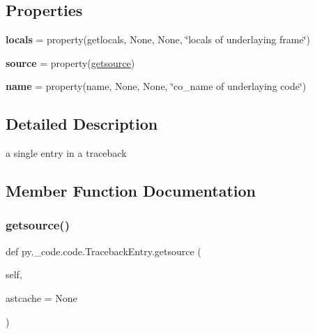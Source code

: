 \subsection*{Properties}
\begin{DoxyCompactItemize}
\item 
\mbox{\label{classpy_1_1__code_1_1code_1_1_traceback_entry_af623f576b943d571186b9024ea262da8}} 
{\bfseries locals} = property(getlocals, None, None, \char`\"{}locals of underlaying frame\char`\"{})
\item 
\mbox{\label{classpy_1_1__code_1_1code_1_1_traceback_entry_a5e8fa813e8ae913efb3367d594cafe65}} 
{\bfseries source} = property(\hyperlink{classpy_1_1__code_1_1code_1_1_traceback_entry_ab958349230aaeb2617fc6289088ca974}{getsource})
\item 
\mbox{\label{classpy_1_1__code_1_1code_1_1_traceback_entry_a6d8dcece5c4654d2f95081d353b0581f}} 
{\bfseries name} = property(name, None, None, \char`\"{}co\+\_\+name of underlaying code\char`\"{})
\end{DoxyCompactItemize}


\subsection{Detailed Description}
\begin{DoxyVerb}a single entry in a traceback \end{DoxyVerb}
 

\subsection{Member Function Documentation}
\mbox{\label{classpy_1_1__code_1_1code_1_1_traceback_entry_ab958349230aaeb2617fc6289088ca974}} 
\subsubsection{\texorpdfstring{getsource()}{getsource()}}
{\footnotesize\ttfamily def py.\+\_\+code.\+code.\+Traceback\+Entry.\+getsource (\begin{DoxyParamCaption}\item[{}]{self,  }\item[{}]{astcache = {\ttfamily None} }\end{DoxyParamCaption})}

